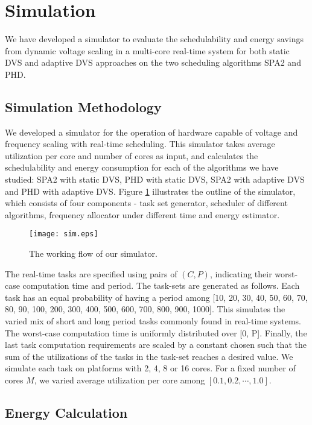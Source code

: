 \documentclass[12pt, journal,compsoc]{IEEEtran}
\begin{document}
\section{Simulation}
\label{sim}

We have developed a simulator to evaluate the schedulability and energy savings from dynamic voltage scaling in a multi-core real-time system for both static DVS and adaptive DVS approaches on the two scheduling algorithms SPA2 and PHD.

\subsection{Simulation Methodology}

We developed a simulator for the operation of hardware capable of voltage and frequency scaling with real-time scheduling. This simulator takes average utilization per core and number of cores as input, and calculates the schedulability and energy consumption for each of the algorithms we have studied: SPA2 with static DVS, PHD with static DVS, SPA2 with adaptive DVS and PHD with adaptive DVS. Figure \ref{so} illustrates the outline of the simulator, which consists of four components - task set generator, scheduler of different algorithms, frequency allocator under different time and energy estimator.

\begin{figure}[!t]
\centering
\texttt{[image: sim.eps]}
\caption{The working flow of our simulator.}
\label{so}
\end{figure}

The real-time tasks are specified using pairs of $(C, P)$, indicating their worst-case computation time and period. The task-sets are generated as follows. Each task has an equal probability of having a period among [10, 20, 30, 40, 50, 60, 70, 80, 90, 100, 200, 300, 400, 500, 600, 700, 800, 900, 1000]. This simulates the varied mix of short and long period tasks commonly found in real-time systems. The worst-case computation time is uniformly distributed over [0, P]. Finally, the last task computation requirements are scaled by a constant chosen such that the sum of the utilizations of the tasks in the task-set reaches a desired value. We simulate each task on platforms with 2, 4, 8 or 16 cores. For a fixed number of cores $M$, we varied average utilization per core among $[0.1, 0.2, \cdots, 1.0]$.

\subsection{Energy Calculation}
\end{document}
